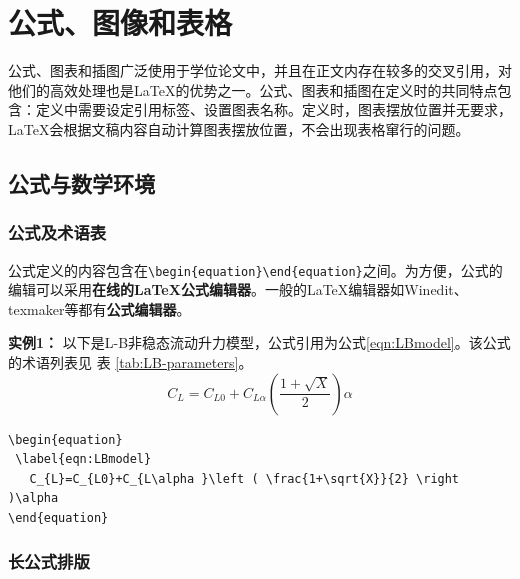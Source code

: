 

\chapter{公式、图像和表格}
\label{chap:example}
公式、图表和插图广泛使用于学位论文中，并且在正文内存在较多的交叉引用，对他们的高效处理也是\LaTeX{}的优势之一。公式、图表和插图在定义时的共同特点包含：定义中需要设定引用标签、设置图表名称。定义时，图表摆放位置并无要求，\LaTeX{}会根据文稿内容自动计算图表摆放位置，不会出现表格窜行的问题。

\section{公式与数学环境}
\label{sec:eqn}

\subsection{公式及术语表}
\label{sec:eqn}

公式定义的内容包含在\verb|\begin{equation}|\verb|\end{equation}|之间。为方便，公式的编辑可以采用\textbf{在线的\LaTeX{}公式编辑器}。一般的\LaTeX{}编辑器如Winedit、texmaker等都有\textbf{公式编辑器}。

{\bf{实例1：}} 以下是L-B非稳态流动升力模型，公式引用为公式\ref{eqn:LBmodel}。该公式的术语列表见 表 \ref{tab:LB-parameters}。
\begin{equation}
 \label{eqn:LBmodel}
   C_{L}=C_{L0}+C_{L\alpha }\left ( \frac{1+\sqrt{X}}{2} \right )\alpha 
\end{equation}

\begin{lstlisting}[language={[LaTeX]TeX}, caption={L-B非稳态流动升力模型}]
\begin{equation}
 \label{eqn:LBmodel}
   C_{L}=C_{L0}+C_{L\alpha }\left ( \frac{1+\sqrt{X}}{2} \right )\alpha 
\end{equation}
\end{lstlisting}

\subsection{长公式排版}


